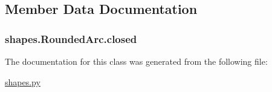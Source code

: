 \subsection{Member Data Documentation}
\hypertarget{classshapes_1_1_rounded_arc_a3e90c90536ac5110e30d9e29cb004696}{}
\subsubsection[{closed}]{\setlength{\rightskip}{0pt plus 5cm}shapes.\+Rounded\+Arc.\+closed}\label{classshapes_1_1_rounded_arc_a3e90c90536ac5110e30d9e29cb004696}


The documentation for this class was generated from the following file\+:\begin{DoxyCompactItemize}
\item 
\hyperlink{shapes_8py}{shapes.\+py}\end{DoxyCompactItemize}
